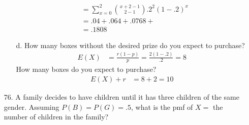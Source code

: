 \documentclass[letterpaper,12pt]{article}
\newcommand{\nb}[3]{%
  \binom{#1 + #2 - 1}{#2 - 1}{#3}^{#2}(1 - #3)^{#1}%
}
\begin{document}
\begin{enumerate}
\begin{enumerate}
\begin{align*}
          &= \sum_{x = 0}^{2} \nb{x}{2}{.2} \\
          &= .04 + .064 + .0768 + \\
          &= .1808
        \end{align*}
      \item[d.]
        How many boxes without the desired prize do you expect to purchase?
        \begin{align*}
          E(X) &= \frac{r(1 - p)}{p} = \frac{2(1 - .2)}{.2} = 8
        \end{align*}
        How many boxes do you expect to purchase?
        \begin{align*}
          E(X) + r &= 8 + 2 = 10
        \end{align*}
    \end{enumerate}
  \item[76.]
    A family decides to have children until it has three children of the same gender. Assuming $P(B) = P(G) = .5$, what is the pmf of $X =$ the number of children in the family?
\end{enumerate}
\end{document}
